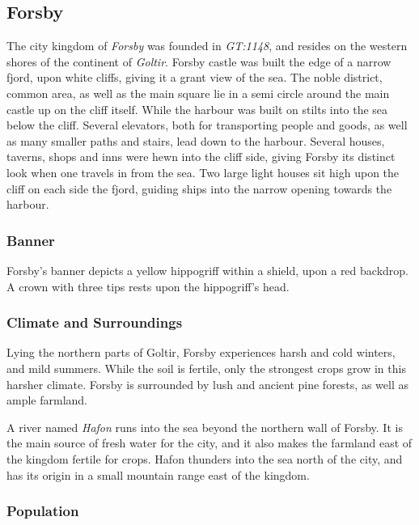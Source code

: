 \subsection{Forsby}
\label{sec:Forsby}


The city kingdom of \emph{Forsby} was founded in \emph{GT:1148}, and resides
on the western shores of the continent of \emph{Goltir}. Forsby castle was
built the edge of a narrow fjord, upon white cliffs, giving it a grant view of
the sea. The noble district, common area, as well as the main square lie in a
semi circle around the main castle up on the cliff itself. While the harbour
was built on stilts into the sea below the cliff. Several elevators, both for
transporting people and goods, as well as many smaller paths and stairs, lead
down to the harbour. Several houses, taverns, shops and inns were hewn into
the cliff side, giving Forsby its distinct look when one travels in from the
sea. Two large light houses sit high upon the cliff on each side the fjord,
guiding ships into the narrow opening towards the harbour.

\subsubsection{Banner}

Forsby's banner depicts a yellow hippogriff within a shield, upon a red
backdrop. A crown with three tips rests upon the hippogriff's head.

\subsubsection{Climate and Surroundings}

Lying the northern parts of Goltir, Forsby experiences harsh and cold winters,
and mild summers. While the soil is fertile, only the strongest crops grow in
this harsher climate. Forsby is surrounded by lush and ancient pine forests,
as well as ample farmland.

A river named \emph{Hafon} runs into the sea beyond the northern wall of
Forsby. It is the main source of fresh water for the city, and it also makes
the farmland east of the kingdom fertile for crops. Hafon thunders into the
sea north of the city, and has its origin in a small mountain range east of
the kingdom.

\subsubsection{Population}

